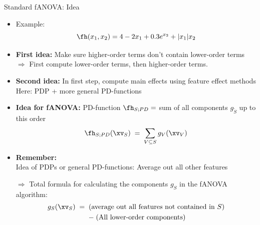 \documentclass[11pt,compress,t,notes=noshow, aspectratio=169, xcolor=table]{beamer}
\begin{document}
\begin{frame}{Standard fANOVA: Idea}

    \begin{itemize}
        \item Example:
        \begin{equation*}
            \fh(x_1, x_2) = 4 - 2x_1 + 0.3 e^{x_2} + |x_1|x_2
        \end{equation*}
        \pause
        \item \textbf{First idea:} Make sure higher-order terms don't contain lower-order terms \\
        \(\Rightarrow\) First compute lower-order terms, then higher-order terms. \\
        \pause
        \item \textbf{Second idea:} In first step, compute main effects using feature effect methods \\
        Here: PDP + more general PD-functions
        \pause
        \item \textbf{Idea for fANOVA:} PD-function $\fh_{S;PD} =$ sum of all components $g_{\tilde{S}}$ up to this order
        $$
        \fh_{S;PD}(\xv_S) \; = \; \sum_{V \subseteq S} g_{V}(\xv_V)
        $$
        \pause
        \item \textbf{Remember:} \\ Idea of PDPs or general PD-functions: Average out all other features
        \item[$\Rightarrow$] Total formula for calculating the components \(g_S\) in the fANOVA algorithm:
        \begin{multline*}
            g_{S} (\xv_S)
            \;=\; (\text{average out all features not contained in } S) \\
            \;-\; (\text{All lower-order components})
        \end{multline*}
    \end{itemize}

    
    
\end{frame}
\end{document}
